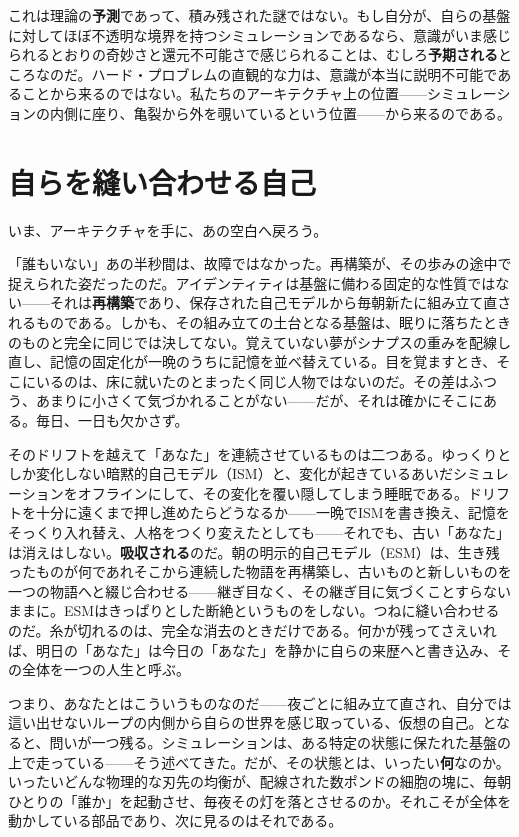 \documentclass[11pt, twoside, openright]{book}
\begin{document}
これは理論の\textbf{予測}であって、積み残された謎ではない。もし自分が、自らの基盤に対してほぼ不透明な境界を持つシミュレーションであるなら、意識がいま感じられるとおりの奇妙さと還元不可能さで感じられることは、むしろ\textbf{予期される}ところなのだ。ハード・プロブレムの直観的な力は、意識が本当に説明不可能であることから来るのではない。私たちのアーキテクチャ上の位置------シミュレーションの内側に座り、亀裂から外を覗いているという位置------から来るのである。

\section*{自らを縫い合わせる自己}

いま、アーキテクチャを手に、あの空白へ戻ろう。

「誰もいない」あの半秒間は、故障ではなかった。再構築が、その歩みの途中で捉えられた姿だったのだ。アイデンティティは基盤に備わる固定的な性質ではない------それは\textbf{再構築}であり、保存された自己モデルから毎朝新たに組み立て直されるものである。しかも、その組み立ての土台となる基盤は、眠りに落ちたときのものと完全に同じでは決してない。覚えていない夢がシナプスの重みを配線し直し、記憶の固定化が一晩のうちに記憶を並べ替えている。目を覚ますとき、そこにいるのは、床に就いたのとまったく同じ人物ではないのだ。その差はふつう、あまりに小さくて気づかれることがない------だが、それは確かにそこにある。毎日、一日も欠かさず。

そのドリフトを越えて「あなた」を連続させているものは二つある。ゆっくりとしか変化しない暗黙的自己モデル（ISM）と、変化が起きているあいだシミュレーションをオフラインにして、その変化を覆い隠してしまう睡眠である。ドリフトを十分に遠くまで押し進めたらどうなるか------一晩でISMを書き換え、記憶をそっくり入れ替え、人格をつくり変えたとしても------それでも、古い「あなた」は消えはしない。\textbf{吸収される}のだ。朝の明示的自己モデル（ESM）は、生き残ったものが何であれそこから連続した物語を再構築し、古いものと新しいものを一つの物語へと綴じ合わせる------継ぎ目なく、その継ぎ目に気づくことすらないままに。ESMはきっぱりとした断絶というものをしない。つねに縫い合わせるのだ。糸が切れるのは、完全な消去のときだけである。何かが残ってさえいれば、明日の「あなた」は今日の「あなた」を静かに自らの来歴へと書き込み、その全体を一つの人生と呼ぶ。

つまり、あなたとはこういうものなのだ------夜ごとに組み立て直され、自分では這い出せないループの内側から自らの世界を感じ取っている、仮想の自己。となると、問いが一つ残る。シミュレーションは、ある特定の状態に保たれた基盤の上で走っている------そう述べてきた。だが、その状態とは、いったい\textbf{何}なのか。いったいどんな物理的な刃先の均衡が、配線された数ポンドの細胞の塊に、毎朝ひとりの「誰か」を起動させ、毎夜その灯を落とさせるのか。それこそが全体を動かしている部品であり、次に見るのはそれである。
\end{document}
